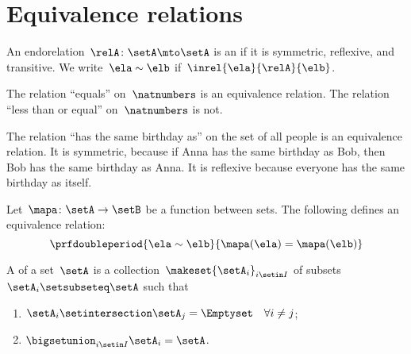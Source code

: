
\section{Equivalence relations}

\begin{ctdefinition}
    \label{def:equivalence-relation}
    An endorelation~$\relA\colon \setA\mto \setA$ is an \emph{} if it is symmetric, reflexive, and transitive.
    We write~$\ela\sim \elb$ if~$\inrel{\ela}{\relA}{\elb}$.
\end{ctdefinition}

\begin{example}
    The relation ``equals'' on~$\natnumbers$ is an equivalence relation.
    The relation ``less than or equal'' on~$\natnumbers$ is not.
\end{example}

\begin{example}
    The relation ``has the same birthday as'' on the set of all people is an equivalence relation.
    It is symmetric, because if Anna has the same birthday as Bob, then Bob has the same birthday as Anna.
    It is reflexive because everyone has the same birthday as itself.
\end{example}

\begin{example}
    Let~$\mapa\colon \setA\to \setB$ be a function between sets.
    The following defines an equivalence relation:
    \begin{equation}
        \prfdoubleperiod{
            \ela\sim \elb
        }{
            \mapa(\ela)=\mapa(\elb)
        }
    \end{equation}
\end{example}

\begin{ctdefinition}[Partition]
    \label{def:partition}
    A \emph{} of a set~$\setA$ is a collection~$\makeset{\setA_i}_{i\setin I}$ of subsets~$\setA_i\setsubseteq \setA$ such that
    \begin{enumerate}
        \item $\setA_i\setintersection \setA_j=\Emptyset \quad \forall i\neq j$;
        \item $\bigsetunion_{i\setin I}\setA_i=\setA$.
    \end{enumerate}
\end{ctdefinition}

